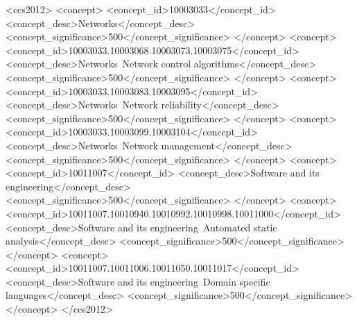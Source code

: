 \documentclass[sigconf]{acmart}
\begin{document}
\begin{CCSXML}
<ccs2012>
<concept>
<concept_id>10003033</concept_id>
<concept_desc>Networks</concept_desc>
<concept_significance>500</concept_significance>
</concept>
<concept>
<concept_id>10003033.10003068.10003073.10003075</concept_id>
<concept_desc>Networks~Network control algorithms</concept_desc>
<concept_significance>500</concept_significance>
</concept>
<concept>
<concept_id>10003033.10003083.10003095</concept_id>
<concept_desc>Networks~Network reliability</concept_desc>
<concept_significance>500</concept_significance>
</concept>
<concept>
<concept_id>10003033.10003099.10003104</concept_id>
<concept_desc>Networks~Network management</concept_desc>
<concept_significance>500</concept_significance>
</concept>
<concept>
<concept_id>10011007</concept_id>
<concept_desc>Software and its engineering</concept_desc>
<concept_significance>500</concept_significance>
</concept>
<concept>
<concept_id>10011007.10010940.10010992.10010998.10011000</concept_id>
<concept_desc>Software and its engineering~Automated static analysis</concept_desc>
<concept_significance>500</concept_significance>
</concept>
<concept>
<concept_id>10011007.10011006.10011050.10011017</concept_id>
<concept_desc>Software and its engineering~Domain specific languages</concept_desc>
<concept_significance>500</concept_significance>
</concept>
</ccs2012>
\end{CCSXML}



\maketitle
\end{document}
